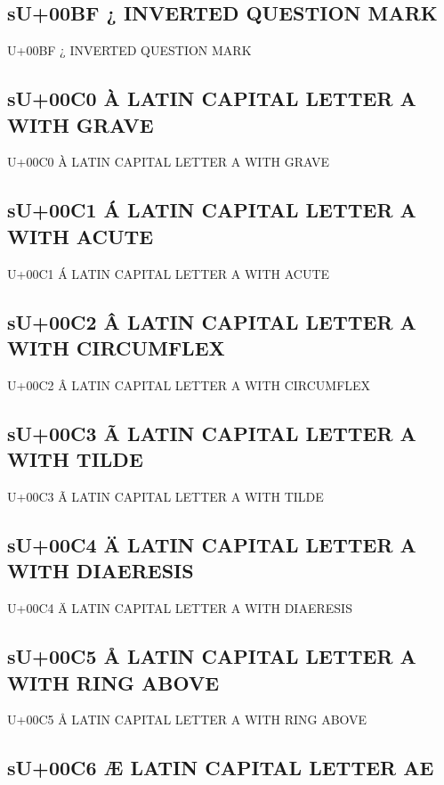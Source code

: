 \subsection{sU+00BF ¿  INVERTED QUESTION MARK}

U+00BF ¿  INVERTED QUESTION MARK

\subsection{sU+00C0 À  LATIN CAPITAL LETTER A WITH GRAVE}

U+00C0 À  LATIN CAPITAL LETTER A WITH GRAVE

\subsection{sU+00C1 Á  LATIN CAPITAL LETTER A WITH ACUTE}

U+00C1 Á  LATIN CAPITAL LETTER A WITH ACUTE

\subsection{sU+00C2 Â  LATIN CAPITAL LETTER A WITH CIRCUMFLEX}

U+00C2 Â  LATIN CAPITAL LETTER A WITH CIRCUMFLEX

\subsection{sU+00C3 Ã  LATIN CAPITAL LETTER A WITH TILDE}

U+00C3 Ã  LATIN CAPITAL LETTER A WITH TILDE

\subsection{sU+00C4 Ä  LATIN CAPITAL LETTER A WITH DIAERESIS}

U+00C4 Ä  LATIN CAPITAL LETTER A WITH DIAERESIS

\subsection{sU+00C5 Å  LATIN CAPITAL LETTER A WITH RING ABOVE}

U+00C5 Å  LATIN CAPITAL LETTER A WITH RING ABOVE

\subsection{sU+00C6 Æ  LATIN CAPITAL LETTER AE}

